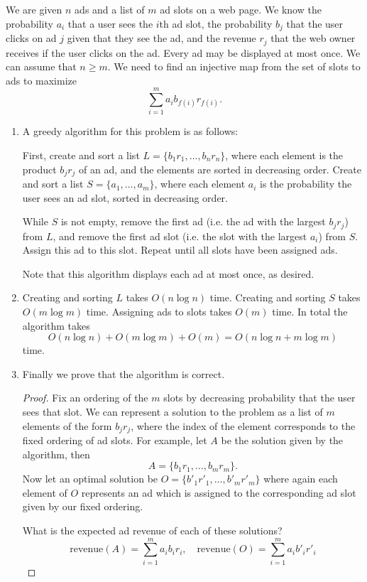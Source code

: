 \documentclass[11pt]{article}
\begin{document}
We are given $n$ ads and a list of $m$ ad slots on a web page. We know the probability $a_i$ that a user sees the $i$th ad slot, the probability $b_j$ that the user clicks on ad $j$ given that they see the ad, and the revenue $r_j$ that the web owner receives if the user clicks on the ad. Every ad may be displayed at most once. We can assume that $n \geq m$. We need to find an injective map from the set of slots to ads to maximize
\[\sum_{i=1}^m a_ib_{f(i)}r_{f(i)}. \]
\begin{enumerate}
\item A greedy algorithm for this problem is as follows:

First, create and sort a list $L = \{b_1r_1, \dots, b_nr_n\}$, where each element is the product $b_jr_j$ of an ad, and the elements are sorted in decreasing order. Create and sort a list $S = \{a_1, \dots, a_m\}$, where each element $a_i$ is the probability the user sees an ad slot, sorted in decreasing order. 

While $S$ is not empty, remove the first ad (i.e. the ad with the largest $b_jr_j$) from $L$, and remove the first ad slot (i.e. the slot with the largest $a_i$) from $S$. Assign this ad to this slot. Repeat until all slots have been assigned ads. 

Note that this algorithm displays each ad at most once, as desired. 
\item Creating and sorting $L$ takes $O(n\log n)$ time. Creating and sorting $S$ takes $O(m\log m)$ time. Assigning ads to slots takes $O(m)$ time. In total the algorithm takes \[O(n\log n) + O(m\log m) + O(m) = O(n\log n + m\log m)\] time. 
\item Finally we prove that the algorithm is correct.
\begin{proof}
Fix an ordering of the $m$ slots by decreasing probability that the user sees that slot. We can represent a solution to the problem as a list of $m$ elements of the form $b_jr_j$, where the index of the element corresponds to the fixed ordering of ad slots. For example, let $A$ be the solution given by the algorithm, then 
\[ A = \{b_1r_1, \dots, b_mr_m\}.\]
Now let an optimal solution be $O = \{b'_1r'_1, \dots, b'_mr'_m\}$ where again each element of $O$ represents an ad which is assigned to the corresponding ad slot given by our fixed ordering.

What is the expected ad revenue of each of these solutions? 
\[ \textrm{revenue}(A) = \sum_{i = 1}^m a_ib_ir_i,\quad \textrm{revenue}(O) = \sum_{i=1}^ma_ib'_ir'_i\]


\end{proof}
\end{enumerate}
\end{document}
